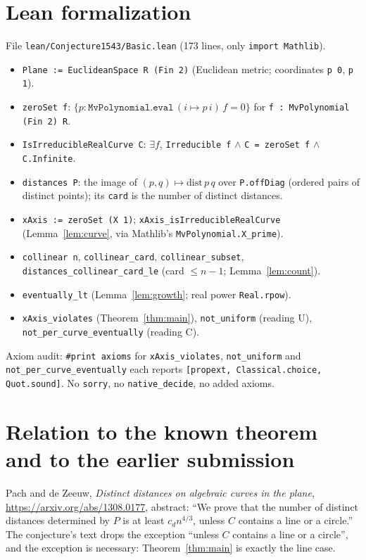 \documentclass[11pt]{article}
\theoremstyle{definition}
\begin{document}
\section{Lean formalization}
File \texttt{lean/Conjecture1543/Basic.lean} (173 lines, only \texttt{import Mathlib}).
\begin{itemize}
\item \texttt{Plane := EuclideanSpace R (Fin 2)} (Euclidean metric; coordinates \texttt{p 0}, \texttt{p 1}).
\item \texttt{zeroSet f}: $\{p : \texttt{MvPolynomial.eval}\,(i\mapsto p\,i)\,f=0\}$ for
\texttt{f : MvPolynomial (Fin 2) R}.
\item \texttt{IsIrreducibleRealCurve C}: $\exists f$, \texttt{Irreducible f} $\wedge$
\texttt{C = zeroSet f} $\wedge$ \texttt{C.Infinite}.
\item \texttt{distances P}: the image of $(p,q)\mapsto \mathrm{dist}\,p\,q$ over
\texttt{P.offDiag} (ordered pairs of distinct points); its \texttt{card} is the number of
distinct distances.
\item \texttt{xAxis := zeroSet (X 1)}; \texttt{xAxis\_isIrreducibleRealCurve} (Lemma~\ref{lem:curve},
via Mathlib's \texttt{MvPolynomial.X\_prime}).
\item \texttt{collinear n}, \texttt{collinear\_card}, \texttt{collinear\_subset},
\texttt{distances\_collinear\_card\_le} (card $\le n-1$; Lemma~\ref{lem:count}).
\item \texttt{eventually\_lt} (Lemma~\ref{lem:growth}; real power \texttt{Real.rpow}).
\item \texttt{xAxis\_violates} (Theorem~\ref{thm:main}),
\texttt{not\_uniform} (reading U), \texttt{not\_per\_curve\_eventually} (reading C).
\end{itemize}
Axiom audit: \texttt{\#print axioms} for \texttt{xAxis\_violates}, \texttt{not\_uniform} and
\texttt{not\_per\_curve\_eventually} each reports \texttt{[propext, Classical.choice, Quot.sound]}.
No \texttt{sorry}, no \texttt{native\_decide}, no added axioms.

\section{Relation to the known theorem and to the earlier submission}\label{sec:rel}
Pach and de Zeeuw, \emph{Distinct distances on algebraic curves in the plane},
\url{https://arxiv.org/abs/1308.0177}, abstract: ``We prove that the number of distinct distances
determined by $P$ is at least $c_d n^{4/3}$, unless $C$ contains a line or a circle.'' The
conjecture's text drops the exception ``unless $C$ contains a line or a circle'', and the
exception is necessary: Theorem~\ref{thm:main} is exactly the line case.
\end{document}
